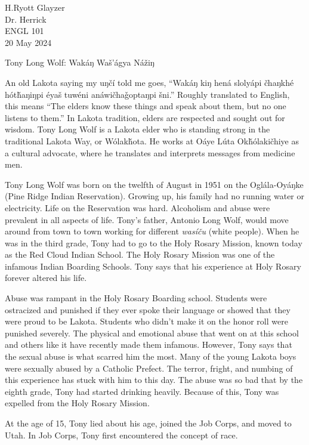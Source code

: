 \documentclass[12pt, letterpaper]{article}
\begin{document}
\begin{flushleft}

H.\@ Ryott Glayzer\\
Dr. Herrick\\
ENGL 101\\
20 May 2024\\


\begin{center}
Tony Long Wolf: Wakáŋ Waš'ágya Nážiŋ
\end{center}


\setlength{\parindent}{0.5in}


An old Lakota saying my uŋčí told me goes, 
``Wakáŋ kiŋ hená slolyápi čhaŋkhé hót\v{h}aŋiŋpi éyaš tuwéni anáwičhaǧoptaŋpi šni.''
Roughly translated to English, this means 
``The elders know these things and speak about them, but no one listens to them.''
In Lakota tradition, elders are respected and sought out for wisdom.
Tony Long Wolf is a Lakota elder who is standing strong in the traditional Lakota Way, or Wólak\v{h}ota.
He works at Oáye Lúta Ok\v{h}ólakičhiye as a cultural advocate, where he translates and interprets
messages from medicine men.
\vspace{5mm}

Tony Long Wolf was born on the twelfth of August in 1951 on the Oglála-Oy\'aŋke (Pine Ridge Indian Reservation).
Growing up, his family had no running water or electricity.
Life on the Reservation was hard.
Alcoholism and abuse were prevalent in all aspects of life.
Tony's father, Antonio Long Wolf, would move around from
town to town working for different \textit{wasíču} (white people).
When he was in the third grade, Tony had to go to the Holy Rosary Mission,
known today as the Red Cloud Indian School.
The Holy Rosary Mission was one of the infamous Indian Boarding Schools.
Tony says that his experience at Holy Rosary forever altered his life.
\vspace{5mm}

Abuse was rampant in the Holy Rosary Boarding school.
Students were ostracized and punished if they ever spoke their language
or showed that they were proud to be Lakota.
Students who didn't make it on the honor roll were punished severely.
The physical and emotional abuse that went on at this school and
others like it have recently made them infamous.
However, Tony says that the sexual abuse is what scarred him the most.
Many of the young Lakota boys were sexually abused by a Catholic Prefect.
The terror, fright, and numbing of this experience has stuck with him to this day.
The abuse was so bad that by the eighth grade, Tony had started drinking heavily.
Because of this, Tony was expelled from the Holy Rosary Mission.
\vspace{5mm}

At the age of 15, Tony lied about his age, joined the Job Corps, and moved to Utah.
In Job Corps, Tony first encountered the concept of race.




\end{flushleft}
\end{document}
